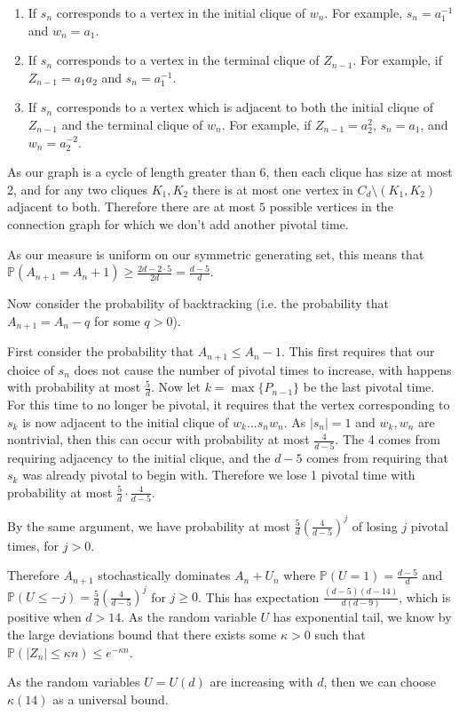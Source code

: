 \documentclass[12pt]{article}
\begin{document}
	  \begin{enumerate} 
		  \item If $ s _{n} $ corresponds to a vertex in the initial clique of $ w _{n} $. For example, $ s _{n} = a ^{-1} _{1} $ and $ w _{n} = a _{1}  $.
		  \item If $ s _{n} $ corresponds to a vertex in the terminal clique of $ Z_{n-1}$. For example, if $ Z _{n-1} = a _{1} a _{2} $ and $ s _{n} = a _{1} ^{-1} $.
		  \item If $ s _{n} $ corresponds to a vertex which is adjacent to both the initial clique of $ Z _{n-1} $ and the terminal clique of $ w _{n} $. For example, if $ Z _{n-1} = a _{2} ^{2} $, $ s _{n} = a _{1} $, and $ w _{n} = a _{2} ^{-2} $.
		    \end{enumerate} As our graph is a cycle of length greater than $ 6 $, then each clique has size at most 2, and for any two cliques $ K _{1}, K _{2} $ there is at most one vertex in $ C _{d} \setminus (K _{1}, K _{2})  $ adjacent to both. Therefore there are at most $ 5 $ possible vertices in the connection graph for which we don't add another pivotal time.

	  As our measure is uniform on our symmetric generating set, this means that $ \mathbb{P} (A _{n+1} = A _{n} +1) \geq \frac{2d-2\cdot 5}{2d} = \frac{d-5}{d} $.

	  Now consider the probability of backtracking (i.e. the probability that $ A _{n+1} = A _{n} - q $ for some $ q>0 $). 

	  First consider the probability that $ A _{n+1} \leq A _{n} -1 $. This first requires that our choice of $ s _{n} $ does not cause the number of pivotal times to increase, with happens with probability at most $ \frac{5}{d} $. Now let $ k = \max \{P _{n-1}\}  $ be the last pivotal time. For this time to no longer be pivotal, it requires that the vertex corresponding to $ s _{k} $ is now adjacent to the initial clique of $ w _{k}...s _{n}w _{n} $. As $ |s _{n}| = 1 $ and $ w _{k}, w _{n} $ are nontrivial, then this can occur with probability at most $ \frac{4}{d-5} $. The 4 comes from requiring adjacency to the initial clique, and the $ d-5 $ comes from requiring that $ s _{k} $ was already pivotal to begin with. Therefore we lose 1 pivotal time with probability at most $ \frac{5}{d}\cdot  \frac{4}{d-5}  $.

	  By the same argument, we have probability at most $ \frac{5}{d} \left(\frac{4}{d-5} \right) ^{j}$ of losing $ j $ pivotal times, for $ j > 0 $.

	  Therefore $ A _{n+1} $ stochastically dominates $ A _{n} + U _{n} $ where $ \mathbb{P} (U=1) = \frac{d-5}{d} $ and $ \mathbb{P}(U \leq -j) = \frac{5}{d} \left( \frac{4}{d-5} \right) ^{j} $ for $ j \geq 0 $. This has expectation $ \frac{(d-5)(d-14)}{d(d-9)} $, which is positive when $ d > 14 $. As the random variable $ U $ has exponential tail, we know by the large deviations bound that there exists some $ \kappa > 0 $ such that $ \mathbb{P} (|Z _{n}| \leq \kappa n) \leq e ^{-\kappa n} $.

	  As the random variables $ U = U(d) $ are increasing with $ d $, then we can choose $ \kappa(14) $ as a universal bound.
\end{document}
